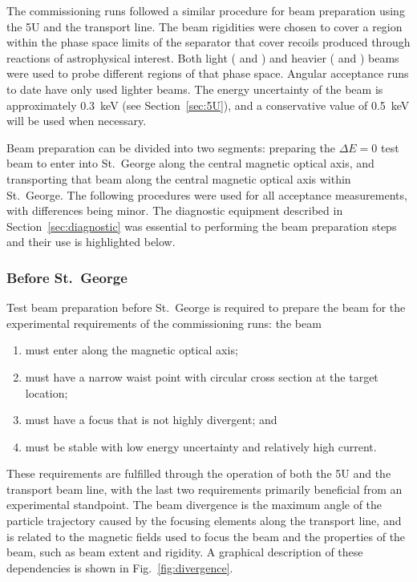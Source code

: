 The commissioning runs followed a similar procedure for beam preparation
using the 5U and the transport line. The beam rigidities were chosen to
cover a region within the phase space limits of the separator that cover
recoils produced through reactions of astrophysical interest. Both light
( and ) and heavier ( and )
beams were used to probe different regions of that phase space. Angular
acceptance runs to date have only used lighter beams. The energy
uncertainty of the beam is approximately 0.3~keV (see
Section~\ref{sec:5U}), and a conservative value of 0.5~keV will be used
when necessary.

Beam preparation can be divided into two segments: preparing the $\Delta
E = 0$ test beam to enter into St.\ George along the central magnetic
optical axis, and transporting that beam along the central magnetic
optical axis within St.\ George. The following procedures were used for
all acceptance measurements, with differences being minor. The
diagnostic equipment described in Section~\ref{sec:diagnostic} was
essential to performing the beam preparation steps and their use is
highlighted below.

\subsubsection{Before St.\ George}

Test beam preparation before St.\ George is required to prepare the beam
for the experimental requirements of the commissioning runs: the beam
\begin{enumerate}
    \item must enter along the magnetic optical axis;
    \item must have a narrow waist point with circular cross section at
        the target location;
    \item must have a focus that is not highly divergent; and
    \item must be stable with low energy uncertainty and relatively high
        current.
\end{enumerate}
These requirements are fulfilled through the operation of both the 5U
and the transport beam line, with the last two requirements primarily
beneficial from an experimental standpoint. The beam divergence is the
maximum angle of the particle trajectory caused by the focusing elements
along the transport line, and is related to the magnetic fields used to
focus the beam and the properties of the beam, such as beam extent and
rigidity. A graphical description of these dependencies is shown in
Fig.~\ref{fig:divergence}.

